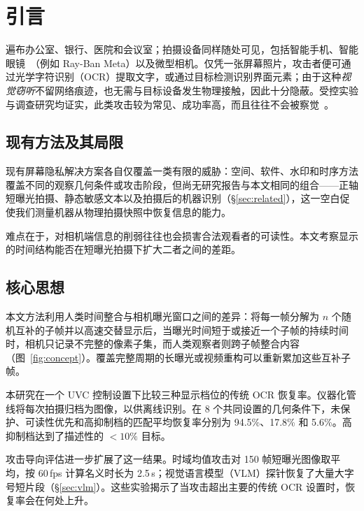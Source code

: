 \documentclass{ieeeaccess}
\begin{document}
\titlepgskip=-21pt
\maketitle

\section{引言}

遍布办公室、银行、医院和会议室；拍摄设备同样随处可见，包括智能手机、智能眼镜~\cite{b_wang2026}（例如 Ray-Ban Meta）以及微型相机。仅凭一张屏幕照片，攻击者便可通过光学字符识别（OCR）提取文字，或通过目标检测识别界面元素；由于这种\emph{视觉窃听}不留网络痕迹，也无需与目标设备发生物理接触，因此十分隐蔽。受控实验与调查研究均证实，此类攻击较为常见、成功率高，而且往往不会被察觉~\cite{b_ponemon2016,b_eiband2017}。

\subsection{现有方法及其局限}

现有屏幕隐私解决方案各自仅覆盖一类有限的威胁：空间、软件、水印和时序方法覆盖不同的观察几何条件或攻击阶段，但尚无研究报告与本文相同的组合——正轴短曝光拍摄、静态敏感文本以及拍摄后的机器识别（\S\ref{sec:related}），这一空白促使我们测量机器从物理拍摄快照中恢复信息的能力。

难点在于，对相机端信息的削弱往往也会损害合法观看者的可读性。本文考察显示的时间结构能否在短曝光拍摄下扩大二者之间的差距。

\subsection{核心思想}

本文方法利用人类时间整合与相机曝光窗口之间的差异：将每一帧分解为 $n$ 个随机互补的子帧并以高速交替显示后，当曝光时间短于或接近一个子帧的持续时间时，相机只记录不完整的像素子集，而人类观察者则跨子帧整合内容（图~\ref{fig:concept}）。覆盖完整周期的长曝光或视频重构可以重新累加这些互补子帧。

本研究在一个 UVC 控制设置下比较三种显示档位的传统 OCR 恢复率。仪器化管线将每次拍摄归档为图像，以供离线识别。在 8 个共同设置的几何条件下，未保护、可读性优先和高抑制档的匹配平均恢复率分别为 94.5\%、17.8\% 和 5.6\%。高抑制档达到了描述性的 $<10\%$ 目标。

攻击导向评估进一步扩展了这一结果。时域均值攻击对 150 帧短曝光图像取平均，按 60\,fps 计算名义时长为 2.5\,s；视觉语言模型（VLM）探针恢复了大量大字号短片段（\S\ref{sec:vlm}）。这些实验揭示了当攻击超出主要的传统 OCR 设置时，恢复率会在何处上升。
\end{document}
